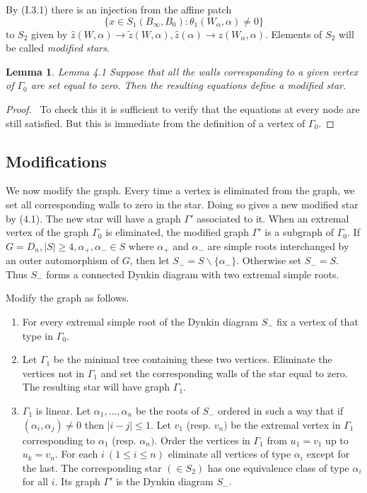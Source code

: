 \documentclass{memo-l}
\newtheorem{lemma}[theorem]{Lemma}
\theoremstyle{definition}
\theoremstyle{remark}
\numberwithin{section}{chapter}
\numberwithin{equation}{chapter}
\begin{document}
\noindent
By (I.3.1) there is an injection from the affine patch 
$$
\{x  \in  S_{1}(B_{{\infty}},B_0):
{\theta}_{1}(W_{{\alpha}},{\alpha})\ne 0\}
$$
to $S_{2}$ given by $\hat z(W,{\alpha}) {\to} \tilde z (W,{\alpha}), \hat
z({\alpha}) {\to} z(W_{{\alpha}},{\alpha})$.  Elements of $S_{2}$ will be
called {\it  modified stars}.

\medskip

\begin{lemma}{Lemma 4.1} Suppose that all the walls corresponding to a
given vertex of ${\Gamma}_{0}$ are set equal to zero.  Then the resulting
equations define a modified star.
\end{lemma}

\medskip

\begin{proof} \ To check this it is sufficient to verify that the
equations at every node are still satisfied.  But this is immediate from
the definition of a vertex of ${\Gamma}_{0}$.
\end{proof} 


\subsection{Modifications}

   We now modify the graph.  Every time a vertex is eliminated from the
graph, we set all corresponding walls to zero in the star.  Doing so gives
a new modified star by (4.1).  The new star will have a graph ${\Gamma}'$
associated to it.  When an extremal vertex of the graph ${\Gamma}_{0}$ is
eliminated, the modified graph ${\Gamma}'$ is a subgraph of ${\Gamma}_{0}$.
  If $G = D_{n}, \vert S\vert \ge 4,
{\alpha}_{+},{\alpha}_{-}  \in  S$ where ${\alpha}_{+}$ and ${\alpha}_{-}$
are simple roots interchanged by an outer automorphism of $G$, then let
$S_{-} = S\backslash \{{\alpha}_{-}\}$.  Otherwise set $S_-=S$.
Thus $S_{-}$ forms a connected
Dynkin diagram with two extremal simple roots.

   Modify the graph as follows.
\begin{enumerate}[label=\arabic*.]
\item For every extremal simple root of the Dynkin diagram $S_{-}$ fix a
vertex of that type in ${\Gamma}_{0}$.
\item Let ${\Gamma}_{1}$ be the minimal tree containing these two vertices.
Eliminate the vertices not in ${\Gamma}_{1}$ and set the corresponding
walls of the star equal to zero.  The resulting star will have graph
${\Gamma}_{1}$.
\item ${\Gamma}_{1}$ is linear.  Let ${\alpha}_{1},\ldots ,{\alpha}_{n}$ be
the roots of $S_{-}$ ordered in such a way that if
$({\alpha}_{i},{\alpha}_{j})\ne 0$ then $\vert i-j\vert \le 1$.  Let
$v_{1}$ (resp.  $v_{n})$ be the extremal vertex in ${\Gamma}_{1}$
corresponding to ${\alpha}_{1}$ (resp.  ${\alpha}_{n})$.  Order the
vertices in ${\Gamma}_{1}$ from $u_{1} = v_{1}$ up to $u_{k} = v_{n}$.  For
each $i\ (1 \le i \le n)$ eliminate all vertices of type ${\alpha}_{i}$
except for the last.  The corresponding star $( \in  S_{2})$ has one
equivalence class of type ${\alpha}_{i}$ for all $i$.  Its graph
${\Gamma}'$ is the Dynkin diagram $S_{-}$.
\end{enumerate}
\end{document}
